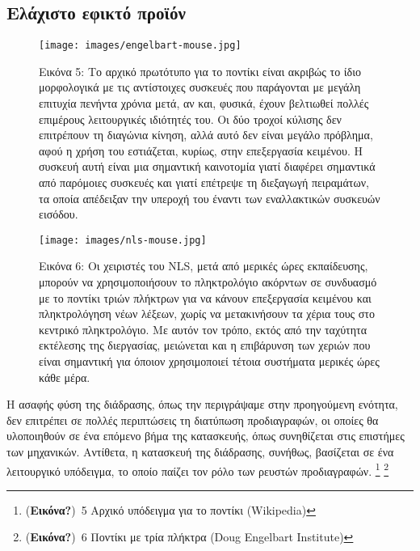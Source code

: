 \documentclass[
]{article}
\begin{document}
\hypertarget{ux3b5ux3bbux3acux3c7ux3b9ux3c3ux3c4ux3bf-ux3b5ux3c6ux3b9ux3baux3c4ux3cc-ux3c0ux3c1ux3bfux3caux3ccux3bd}{%
\subsection{Ελάχιστο εφικτό
προϊόν}\label{ux3b5ux3bbux3acux3c7ux3b9ux3c3ux3c4ux3bf-ux3b5ux3c6ux3b9ux3baux3c4ux3cc-ux3c0ux3c1ux3bfux3caux3ccux3bd}}

\leavevmode{}%
\begin{figure}
\hypertarget{fig:engelbart-mouse}{%
\centering
\texttt{[image: images/engelbart-mouse.jpg]}
\caption{Εικόνα 5: Το αρχικό πρωτότυπο για το ποντίκι είναι ακριβώς το
ίδιο μορφολογικά με τις αντίστοιχες συσκευές που παράγονται με μεγάλη
επιτυχία πενήντα χρόνια μετά, αν και, φυσικά, έχουν βελτιωθεί πολλές
επιμέρους λειτουργικές ιδιότητές του. Οι δύο τροχοί κύλισης δεν
επιτρέπουν τη διαγώνια κίνηση, αλλά αυτό δεν είναι μεγάλο πρόβλημα, αφού
η χρήση του εστιάζεται, κυρίως, στην επεξεργασία κειμένου. Η συσκευή
αυτή είναι μια σημαντική καινοτομία γιατί διαφέρει σημαντικά από
παρόμοιες συσκευές και γιατί επέτρεψε τη διεξαγωγή πειραμάτων, τα οποία
απέδειξαν την υπεροχή του έναντι των εναλλακτικών συσκευών
εισόδου.}\label{fig:engelbart-mouse}
}
\end{figure}

\leavevmode{}%
\begin{figure}
\hypertarget{fig:nls-mouse}{%
\centering
\texttt{[image: images/nls-mouse.jpg]}
\caption{Εικόνα 6: Οι χειριστές του NLS, μετά από μερικές ώρες
εκπαίδευσης, μπορούν να χρησιμοποιήσουν το πληκτρολόγιο ακόρντων σε
συνδυασμό με το ποντίκι τριών πλήκτρων για να κάνουν επεξεργασία
κειμένου και πληκτρολόγηση νέων λέξεων, χωρίς να μετακινήσουν τα χέρια
τους στο κεντρικό πληκτρολόγιο. Με αυτόν τον τρόπο, εκτός από την
ταχύτητα εκτέλεσης της διεργασίας, μειώνεται και η επιβάρυνση των χεριών
που είναι σημαντική για όποιον χρησιμοποιεί τέτοια συστήματα μερικές
ώρες κάθε μέρα.}\label{fig:nls-mouse}
}
\end{figure}

Η ασαφής φύση της διάδρασης, όπως την περιγράψαμε στην προηγούμενη
ενότητα, δεν επιτρέπει σε πολλές περιπτώσεις τη διατύπωση προδιαγραφών,
οι οποίες θα υλοποιηθούν σε ένα επόμενο βήμα της κατασκευής, όπως
συνηθίζεται στις επιστήμες των μηχανικών. Αντίθετα, η κατασκευή της
διάδρασης, συνήθως, βασίζεται σε ένα λειτουργικό υπόδειγμα, το οποίο
παίζει τον ρόλο των ρευστών προδιαγραφών. \footnote{(\textbf{Εικόνα?})~5
  Αρχικό υπόδειγμα για το ποντίκι (Wikipedia)} \footnote{(\textbf{Εικόνα?})~6
  Ποντίκι με τρία πλήκτρα (Doug Engelbart Institute)}
\end{document}
